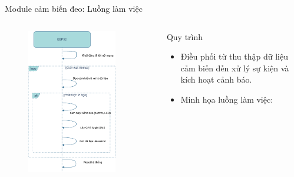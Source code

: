 
\begin{frame}[fragile]{Module cảm biến đeo: Luồng làm việc}
    \begin{columns}[t]
        \begin{column}{0.6\textwidth}
            \begin{figure}
                \centering
                \includegraphics[width=0.85\textwidth,height=0.7\textheight,keepaspectratio]{images/module1_time_flow.pdf}
            \end{figure}
        \end{column}
        \begin{column}{0.4\textwidth}
            \begin{block}{Quy trình}
                \begin{itemize}
                    \item Điều phối từ thu thập dữ liệu cảm biến đến xử lý sự kiện và kích hoạt cảnh báo.
                    \item Minh họa luồng làm việc:

\end{itemize}
\end{block}
\end{column}
\end{columns}
\end{frame}
